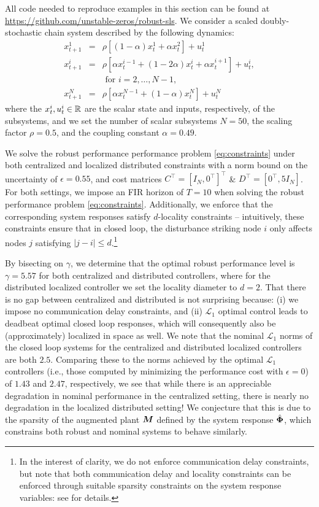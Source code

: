 All code needed to reproduce examples in this section can be found at \url{https://github.com/unstable-zeros/robust-sls}. We consider a scaled doubly-stochastic chain system described by the following dynamics:
\begin{equation}\label{eq:chain}
\begin{array}{rcl}
x^1_{t+1} &=& \rho\left[(1-\alpha)x^1_t + \alpha x^2_t\right] + u^1_t\\
x^i_{t+1} &=& \rho\left[\alpha x^{i-1}_t + (1-2\alpha)x^i_t + \alpha x^{i+1}_t\right] + u^i_t,\\
&& \text{ for $i=2,\dots,N-1$,} \\
 x^N_{t+1} &=& \rho\left[\alpha x^{N-1}_t + (1-\alpha)x^N_t\right] + u^N_t
 \end{array}
\end{equation}
where the $x^i_t, u^i_t \in \mathbb{R}$ are the scalar state and inputs, respectively, of the subsystems, and we set the number of scalar subsystems $N=50$, the scaling factor $\rho = 0.5$, and the coupling constant $\alpha = 0.49$.  

We solve the robust performance performance problem \eqref{eq:constraints} under both centralized and localized distributed constraints with a norm bound on the uncertainty of $\epsilon = 0.55$, and cost matrices $C^\top = [I_N, 0^\top]^\top$ \& $D^\top = [0^\top, 5I_N]$.  For both settings, we impose an FIR horizon of $T=10$ when solving the robust performance problem \eqref{eq:constraints}.  Additionally, we enforce that the corresponding system responses satisfy $d$-locality constraints -- intuitively, these constraints ensure that in closed loop, the disturbance striking node $i$ only affects nodes $j$ satisfying $|j-i|\leq d$.\footnote{In the interest of clarity, we do not enforce communication delay constraints, but note that both communication delay and locality constraints can be enforced through suitable sparsity constraints on the system response variables: see \cite{anderson2019system} for details.}

By bisecting on $\gamma$, we determine that the optimal robust performance level is $\gamma = 5.57$ for both centralized and distributed controllers, where for the distributed localized controller we set the locality diameter to $d=2$.  That there is no gap between centralized and distributed is not surprising because: (i) we impose no communication delay constraints, and (ii) $\mathcal{L}_1$ optimal control leads to deadbeat optimal closed loop responses, which will consequently also be (approximately) localized in space as well.  We note that the nominal $\mathcal{L}_1$ norms of the closed loop systems for the centralized and distributed localized controllers are both $2.5$.  Comparing these to the norms achieved by the optimal $\mathcal{L}_1$ controllers (i.e., those computed by minimizing the performance cost with $\epsilon = 0$) of $1.43$ and $2.47$, respectively, we see that while there is an appreciable degradation in nominal performance in the centralized setting, there is nearly no degradation in the localized distributed setting!  We conjecture that this is due to the sparsity of the augmented plant $\boldsymbol{M}$ defined by the system response $\hat{\boldsymbol{\Phi}}$, which constrains both robust and nominal systems to behave similarly.

